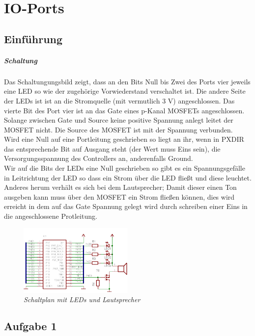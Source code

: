 \chapter{IO-Ports}

\section{Einführung}

\paragraph*{Schaltung}
Das Schaltungungsbild zeigt, dass an den Bits Null bis Zwei des Ports vier 
jeweils eine LED so wie der zugehörige Vorwiederstand verschaltet ist. 
Die andere Seite der LEDs ist ist an die Stromquelle (mit vermutlich 3 V) 
angeschlossen. Das vierte Bit des Port vier ist an das Gate eines p-Kanal 
MOSFETs angeschlossen. Solange zwischen Gate und Source keine positive
Spannung anlegt leitet der MOSFET nicht. Die Source des MOSFET ist mit 
der Spannung verbunden. \\
Wird eine Null auf eine Portleitung geschrieben so liegt an ihr, wenn in
PXDIR das entsprechende Bit auf Ausgang steht (der Wert muss Eins sein), 
die Versorgungsspannung des Controllers an, anderenfalls Ground. \\
Wir auf die Bits der LEDs eine Null geschrieben so gibt es ein 
Spannungsgefälle in Leitrichtung der LED so dass ein Strom über die LED 
fließt und diese leuchtet. Anderes herum verhält es sich bei dem 
Lautsprecher; Damit dieser einen Ton ausgeben kann muss über den MOSFET
ein Strom fließen können, dies wird erreicht in dem auf das Gate Spannung 
gelegt wird durch schreiben einer Eins in die angeschlossene Protleitung.

\begin{figure}
\centering
\includegraphics[width=0.5\textwidth]{img/mikrocontrollerUNDled.png}
\caption{\em \small Schaltplan mit LEDs und Lautsprecher}
\end{figure}

\section{Aufgabe 1}

